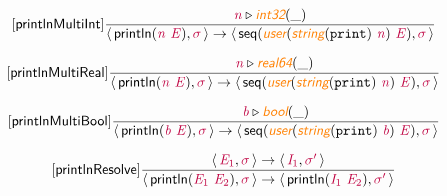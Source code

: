 \documentclass[10pt,leqno,fleqn]{article}
\newcommand{\artVariable}[1]{\mbox{\color{purple}\em #1\/}}
\newcommand{\artConstructor}[1]{\mbox{\sf #1}}
\newcommand{\artCaseInsensitiveLiteral}[1]{\mbox{\tt #1}}
\newcommand{\artSpecial}[1]{\mbox{\color{orange}\sf\em #1}}
\begin{document}
\begin{equation}
\tag*{[\artConstructor{\sf printlnMultiInt}]}
\begin{split}\frac{ \artVariable{n}\triangleright \artSpecial{int32}(\_) }{\langle\, \artConstructor{\sf println}(\artVariable{n}\ \artVariable{E}), \artVariable{$\sigma$}\,\rangle \rightarrow \langle\, \artConstructor{\sf seq}(\artSpecial{user}(\artSpecial{string}(\artCaseInsensitiveLiteral{print})\ \artVariable{n})\ \artVariable{E}), \artVariable{$\sigma$}\,\rangle }
\end{split}
\end{equation}

\begin{equation}
\tag*{[\artConstructor{\sf printlnMultiReal}]}
\begin{split}\frac{ \artVariable{n}\triangleright \artSpecial{real64}(\_) }{\langle\, \artConstructor{\sf println}(\artVariable{n}\ \artVariable{E}), \artVariable{$\sigma$}\,\rangle \rightarrow \langle\, \artConstructor{\sf seq}(\artSpecial{user}(\artSpecial{string}(\artCaseInsensitiveLiteral{print})\ \artVariable{n})\ \artVariable{E}), \artVariable{$\sigma$}\,\rangle }
\end{split}
\end{equation}

\begin{equation}
\tag*{[\artConstructor{\sf printlnMultiBool}]}
\begin{split}\frac{ \artVariable{b}\triangleright \artSpecial{bool}(\_) }{\langle\, \artConstructor{\sf println}(\artVariable{b}\ \artVariable{E}), \artVariable{$\sigma$}\,\rangle \rightarrow \langle\, \artConstructor{\sf seq}(\artSpecial{user}(\artSpecial{string}(\artCaseInsensitiveLiteral{print})\ \artVariable{b})\ \artVariable{E}), \artVariable{$\sigma$}\,\rangle }
\end{split}
\end{equation}

\begin{equation}
\tag*{[\artConstructor{\sf printlnResolve}]}
\begin{split}\frac{\langle\, \artVariable{E$_{1}$}, \artVariable{$\sigma$}\,\rangle \rightarrow \langle\, \artVariable{I$_{1}$}, \artVariable{$\sigma$\/$^\prime$}\,\rangle }{\langle\, \artConstructor{\sf println}(\artVariable{E$_{1}$}\ \artVariable{E$_{2}$}), \artVariable{$\sigma$}\,\rangle \rightarrow \langle\, \artConstructor{\sf println}(\artVariable{I$_{1}$}\ \artVariable{E$_{2}$}), \artVariable{$\sigma$\/$^\prime$}\,\rangle }
\end{split}
\end{equation}
\end{document}
